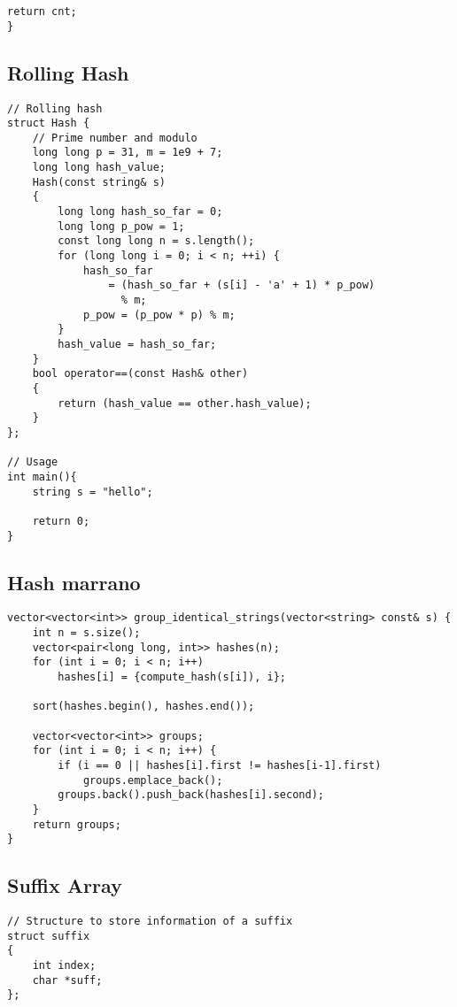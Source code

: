 \documentclass[10pt]{article}
\begin{document}
\begin{multicols*}{2}
\begin{lstlisting}[style=compactcpp]
    return cnt;
}

\end{lstlisting}

\subsection{Rolling Hash}
\begin{lstlisting}[style=compactcpp]
// Rolling hash
struct Hash {
    // Prime number and modulo
    long long p = 31, m = 1e9 + 7;
    long long hash_value;
    Hash(const string& s)
    {
        long long hash_so_far = 0;
        long long p_pow = 1;
        const long long n = s.length();
        for (long long i = 0; i < n; ++i) {
            hash_so_far
                = (hash_so_far + (s[i] - 'a' + 1) * p_pow)
                  % m;
            p_pow = (p_pow * p) % m;
        }
        hash_value = hash_so_far;
    }
    bool operator==(const Hash& other)
    {
        return (hash_value == other.hash_value);
    }
};

// Usage
int main(){
    string s = "hello";

    return 0;
}

\end{lstlisting}

\subsection{Hash marrano}

\begin{lstlisting}[style=compactcpp]
vector<vector<int>> group_identical_strings(vector<string> const& s) {
    int n = s.size();
    vector<pair<long long, int>> hashes(n);
    for (int i = 0; i < n; i++)
        hashes[i] = {compute_hash(s[i]), i};

    sort(hashes.begin(), hashes.end());

    vector<vector<int>> groups;
    for (int i = 0; i < n; i++) {
        if (i == 0 || hashes[i].first != hashes[i-1].first)
            groups.emplace_back();
        groups.back().push_back(hashes[i].second);
    }
    return groups;
}
\end{lstlisting}

\subsection{Suffix Array}

\begin{lstlisting}[style=compactcpp]
// Structure to store information of a suffix
struct suffix
{
    int index;
    char *suff;
};
 

\end{lstlisting}
\end{multicols*}
\end{document}
